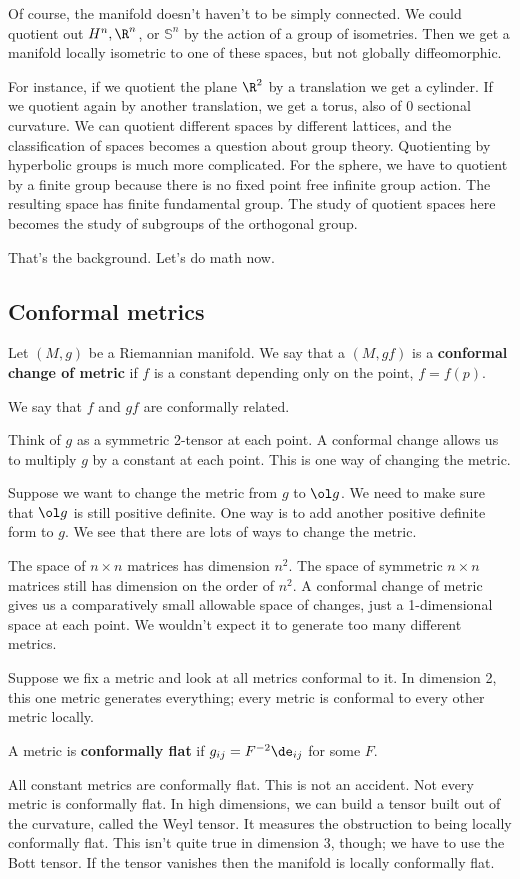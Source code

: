 Of course, the manifold doesn't haven't to be simply connected. We could quotient out $H^n, \R^n$, or $\mathbb S^n$ by the action of a group of isometries. Then we get a manifold locally isometric to one of these spaces, but not globally diffeomorphic.

For instance, if we quotient the plane $\R^2$ by a translation we get a cylinder. If we quotient again by another translation, we get a torus, also of 0 sectional curvature. We can quotient different spaces by different lattices, and the classification of spaces becomes a question about group theory. Quotienting by hyperbolic groups is much more complicated. For the sphere, we have to quotient by a finite group because there is no fixed point free infinite group action. The resulting space has finite fundamental group.
The study of quotient spaces here becomes the study of subgroups of the orthogonal group.

That's the background. Let's do math now.
 
\subsection{Conformal metrics}
\begin{df}
Let $(M,g)$ be a Riemannian manifold. We say that a $(M,gf)$ is a \textbf{conformal change of metric} if $f$ is a constant depending only on the point, $f=f(p)$.

We say that $f$ and $gf$ are conformally related.
\end{df}
Think of $g$ as a symmetric 2-tensor at each point. A conformal  change allows us to multiply $g$ by a constant at each point. This is one way of changing the metric. 

Suppose we want to change the metric from $g$ to $\ol g$. %
We need to make sure that $\ol g$ is still positive definite. One way is to add another positive definite form to $g$. We see that there are lots of ways to change the metric.

The space of $n\times n$ matrices has dimension $n^2$. The space of symmetric $n\times n$ matrices still has dimension on the order of $n^2$. A conformal change of metric gives us a comparatively small allowable space of changes, just a 1-dimensional space at each point. We wouldn't expect it to generate too many different metrics.

Suppose we fix a metric and look at all metrics conformal to it. In dimension 2, this one metric generates everything; every metric is conformal to every other metric locally.
\begin{df}
A metric is \textbf{conformally flat} if $g_{ij}=F^{-2}\de_{ij}$ for some $F$. %
\end{df}
All constant metrics are conformally flat. This is not an accident. Not every metric is conformally flat. In high dimensions, we can build a tensor built out of the curvature, called the Weyl tensor. It measures the obstruction to being locally conformally flat. This isn't quite true in dimension 3, though; we have to use the Bott tensor. If the tensor vanishes then the manifold is locally conformally flat.


